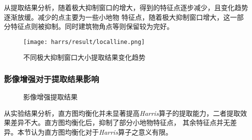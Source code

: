 \begin{enumerate}
        \hspace{20pt}从提取结果分析，随着极大抑制窗口的增大，得到的特征点逐步减少，且变化趋势逐渐放缓。减少的点主要为一些小地物
        特征点，随着极大抑制窗口增大，这一部分特征点则被抑制。同时建筑物角点等则保留较为完好。

        \begin{figure}[H]
            \centering 
            \texttt{[image: harrs/result/localline.png]}
            \caption{不同极大抑制窗口大小提取结果变化趋势}
            \label{harris_maxline}
        \end{figure}

    \end{enumerate}

    \subsubsection{影像增强对于提取结果影响}
    \begin{figure}[H]
        \centering
        \caption{影像增强提取结果}
        \label{harris_enhance}
    \end{figure}

    从实验结果分析，直方图均衡化并未显著提高\textit{Harris}算子的提取能力，二者提取效果差异不大。直方图均衡化后，抑制了部分小地物特征点，
    其余特征点并无差异。本节认为直方图均衡化对于\textit{Harris}算子之意义有限。

